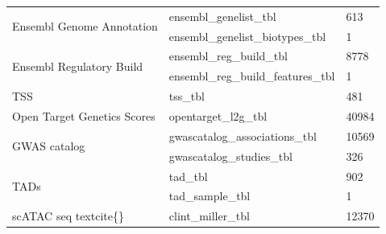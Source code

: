 \begin{table}[h!]
\begin{tabular}{l|l|l}
        \multirow{2}{*}{Ensembl Genome Annotation} & ensembl\_genelist\_tbl             & 613                                                                                                 \\
                                                   & ensembl\_genelist\_biotypes\_tbl   & 1                                                                                                   \\ \hline
        \multirow{2}{*}{Ensembl Regulatory Build}  & ensembl\_reg\_build\_tbl           & 8778                                                                                                \\
                                                   & ensembl\_reg\_build\_features\_tbl & 1                                                                                                   \\ \hline
        TSS                                        & tss\_tbl                           & 481                                                                                                 \\ \hline
        Open Target Genetics Scores                & opentarget\_l2g\_tbl               & 40984                                                                                               \\ \hline
        \multirow{2}{*}{GWAS catalog}              & gwascatalog\_associations\_tbl     & 10569                                                                                               \\
                                                   & gwascatalog\_studies\_tbl          & 326                                                                                                 \\ \hline
        \multirow{2}{*}{TADs}                      & tad\_tbl                           & 902                                                                                                 \\
                                                   & tad\_sample\_tbl                   & 1                                                                                                   \\ \hline
        \multirow{2}{*}{scATAC seq textcite\{\}}   & clint\_miller\_tbl                 & 12370                                                                                               \\

\end{tabular}
\end{table}
